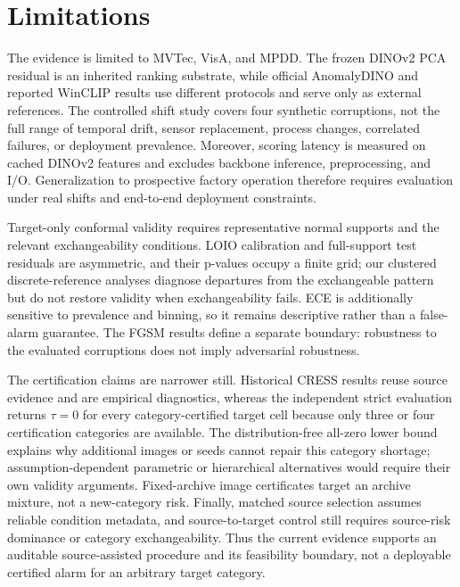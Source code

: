 \section{Limitations}\label{sec:limitations}
The evidence is limited to MVTec, VisA, and MPDD. The frozen DINOv2 PCA residual is an inherited ranking substrate, while official AnomalyDINO and reported WinCLIP results use different protocols and serve only as external references. The controlled shift study covers four synthetic corruptions, not the full range of temporal drift, sensor replacement, process changes, correlated failures, or deployment prevalence. Moreover, scoring latency is measured on cached DINOv2 features and excludes backbone inference, preprocessing, and I/O. Generalization to prospective factory operation therefore requires evaluation under real shifts and end-to-end deployment constraints.

Target-only conformal validity requires representative normal supports and the relevant exchangeability conditions. LOIO calibration and full-support test residuals are asymmetric, and their p-values occupy a finite grid; our clustered discrete-reference analyses diagnose departures from the exchangeable pattern but do not restore validity when exchangeability fails. ECE is additionally sensitive to prevalence and binning, so it remains descriptive rather than a false-alarm guarantee. The FGSM results define a separate boundary: robustness to the evaluated corruptions does not imply adversarial robustness.

The certification claims are narrower still. Historical CRESS results reuse source evidence and are empirical diagnostics, whereas the independent strict evaluation returns $\tau=0$ for every category-certified target cell because only three or four certification categories are available. The distribution-free all-zero lower bound explains why additional images or seeds cannot repair this category shortage; assumption-dependent parametric or hierarchical alternatives would require their own validity arguments. Fixed-archive image certificates target an archive mixture, not a new-category risk. Finally, matched source selection assumes reliable condition metadata, and source-to-target control still requires source-risk dominance or category exchangeability. Thus the current evidence supports an auditable source-assisted procedure and its feasibility boundary, not a deployable certified alarm for an arbitrary target category.
